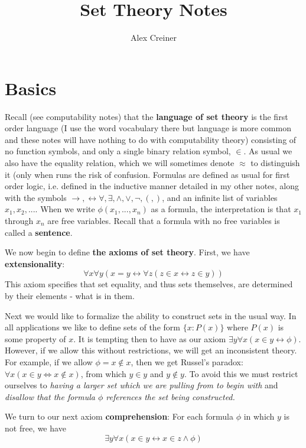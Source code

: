 \documentclass{article}
\title{Set Theory Notes}
\author{Alex Creiner}
\theoremstyle{definition}
\theoremstyle{plain}
\theoremstyle{theorem}
\begin{document}
\maketitle
\section{Basics}
Recall (see computability notes) that the \textbf{language of set theory} is the first order language (I use the word vocabulary there but language is more common and these notes will have nothing to do with computability theory) consisting of no function symbols, and only a single binary relation symbol, $\in$. As usual we also have the equality relation, which we will sometimes denote $\approx$ to distinguish it (only when runs the risk of confusion. Formulas are defined as usual for first order logic, i.e. defined in the inductive manner detailed in my other notes, along with the symbols $\rightarrow,\leftrightarrow \forall,\exists,\wedge,\vee,\neg,(,)$, and an infinite list of variables $x_1,x_2,...$.  When we write $\phi(x_1,...,x_n)$ as a formula, the interpretation is that $x_1$ through $x_n$ are free variables. Recall that a formula with no free variables is called a \textbf{sentence}. 
\par We now begin to define \textbf{the axioms of set theory}.
First, we have \textbf{extensionality}: \[ \forall x \forall y (x =y \leftrightarrow \forall z (z \in x \leftrightarrow z \in y)) \] 
This axiom specifies that set equality, and thus sets themselves, are determined by their elements - what is in them. 
\par Next we would like to formalize the ability to construct sets in the usual way. In all applications we like to define sets of the form $\{x: P(x)\}$ where $P(x)$ is some property of $x$. It is tempting then to have as our axiom $\exists y \forall x (x \in y \leftrightarrow \phi)$. However, if we allow this without restrictions, we will get an inconsistent theory. For example, if we allow $\phi = x \notin x$, then we get Russel's paradox: $\forall x (x \in y \iff x \notin x)$, from which $y \in y$ and $y \notin y$. To avoid this we must restrict ourselves to \textit{having a larger set which we are pulling from to begin with} and \textit{disallow that the formula $\phi$ references the set being constructed.} 
\par We turn to our next axiom \textbf{comprehension}: For each formula $\phi$ in which $y$ is not free, we have 
\[ \exists y \forall x (x \in y \leftrightarrow x \in z \wedge \phi) \]
\end{document}

